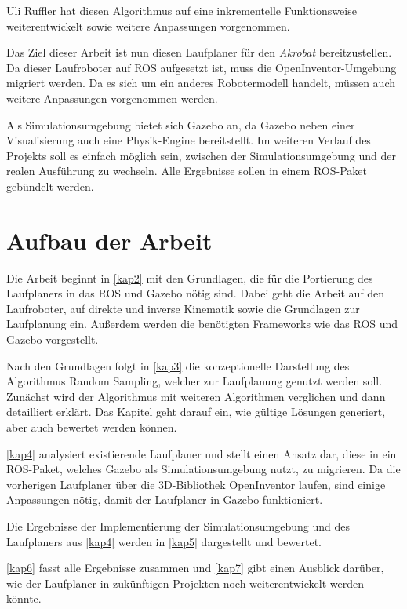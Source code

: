 Uli Ruffler \autocite{ruffler2006} hat diesen Algorithmus auf eine inkrementelle Funktionsweise weiterentwickelt sowie weitere Anpassungen vorgenommen.

Das Ziel dieser Arbeit ist nun diesen Laufplaner für den \emph{Akrobat} bereitzustellen. Da dieser Laufroboter auf \ac{ROS} aufgesetzt ist, muss die OpenInventor-Umgebung migriert werden. Da es sich um ein anderes Robotermodell handelt, müssen auch weitere Anpassungen vorgenommen werden.

Als Simulationsumgebung bietet sich Gazebo an, da Gazebo neben einer Visualisierung auch eine Physik-Engine bereitstellt. Im weiteren Verlauf des Projekts soll es einfach möglich sein, zwischen der Simulationsumgebung und der realen Ausführung zu wechseln. Alle Ergebnisse sollen in einem \ac{ROS}-Paket gebündelt werden.

\section{Aufbau der Arbeit}

Die Arbeit beginnt in \autoref{kap2} mit den Grundlagen, die für die Portierung des Laufplaners in das \ac{ROS} und Gazebo nötig sind. Dabei geht die Arbeit auf den Laufroboter, auf direkte und inverse Kinematik sowie die Grundlagen zur Laufplanung ein. Außerdem werden die benötigten Frameworks wie das \ac{ROS} und Gazebo vorgestellt.

Nach den Grundlagen folgt in \autoref{kap3} die konzeptionelle Darstellung des Algorithmus Random Sampling, welcher zur Laufplanung genutzt werden soll. Zunächst wird der Algorithmus mit weiteren Algorithmen verglichen und dann detailliert erklärt. Das Kapitel geht darauf ein, wie gültige Lösungen generiert, aber auch bewertet werden können.

\autoref{kap4} analysiert existierende Laufplaner und stellt einen Ansatz dar, diese in ein \ac{ROS}-Paket, welches Gazebo als Simulationsumgebung nutzt, zu migrieren. Da die vorherigen Laufplaner über die 3D-Bibliothek OpenInventor laufen, sind einige Anpassungen nötig, damit der Laufplaner in Gazebo funktioniert.

Die Ergebnisse der Implementierung der Simulationsumgebung und des Laufplaners aus \autoref{kap4} werden in \autoref{kap5} dargestellt und bewertet.

\autoref{kap6} fasst alle Ergebnisse zusammen und \autoref{kap7} gibt einen Ausblick darüber, wie der Laufplaner in zukünftigen Projekten noch weiterentwickelt werden könnte.